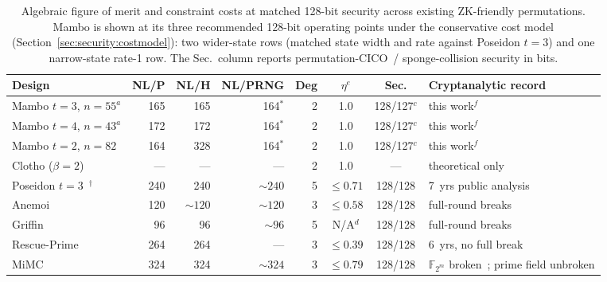 \documentclass[11pt,a4paper]{article}
\theoremstyle{definition}
\newcommand{\F}{\mathbb{F}}
\begin{document}
\begin{table}[t]
\centering
\caption{Algebraic figure of merit and constraint costs at matched 128-bit
security across existing ZK-friendly permutations. Mambo is shown at its
three recommended 128-bit operating points under the conservative cost
model (Section~\ref{sec:security:costmodel}): two wider-state rows
(matched state width and rate against Poseidon $t\!=\!3$) and one
narrow-state rate-1 row. The Sec.\ column reports permutation-CICO~/
sponge-collision security in bits.}
\label{tab:landscape}
{\setlength{\tabcolsep}{3pt}\footnotesize%
\begin{tabular}{@{}lrrrrccl@{}}
\toprule
Design & NL/P & NL/H & NL/PRNG & Deg & $\eta^{e}$ & Sec. & Cryptanalytic record \\
\midrule
Mambo $t\!=\!3$, $n\!=\!55^{a}$ & 165 & 165 & 164$^*$ & 2 & 1.0 & 128/127$^{c}$ & this work$^{f}$ \\
Mambo $t\!=\!4$, $n\!=\!43^{a}$ & 172 & 172 & 164$^*$ & 2 & 1.0 & 128/127$^{c}$ & this work$^{f}$ \\
Mambo $t\!=\!2$, $n\!=\!82$ & 164 & 328 & 164$^*$ & 2 & 1.0 & 128/127$^{c}$ & this work$^{f}$ \\
Clotho ($\beta\!=\!2$)~\cite{ALFOMs} & --- & --- & --- & 2 & 1.0 & --- & theoretical only \\
Poseidon $t\!=\!3$~\cite{Poseidon,Poseidon2}$^\dagger$ & 240 & 240 & ${\sim}240$ & 5 & $\le 0.71$ & 128/128 & 7~yrs public analysis \\
Anemoi~\cite{Anemoi}      & 120 & ${\sim}120$ & ${\sim}120$ & 3 & $\le 0.58$ & 128/128 & full-round breaks~\cite{FreeLunch,Anemoi_attack} \\
Griffin~\cite{Griffin}    &  96 &  96 & ${\sim}96$ & 5 & N/A$^{d}$ & 128/128 & full-round breaks~\cite{FreeLunch,Griffin_break} \\
Rescue-Prime~\cite{Rescue} & 264 & 264 & --- & 3 & $\le 0.39$ & 128/128 & 6~yrs, no full break \\
MiMC~\cite{MiMC}      & 324 & 324 & ${\sim}324$ & 3 & $\le 0.79$ & 128/128 & $\F_{2^m}$ broken~\cite{MiMC_fulldegree}; prime field unbroken \\
\bottomrule
\end{tabular}}%
\smallskip


\end{table}
\end{document}
